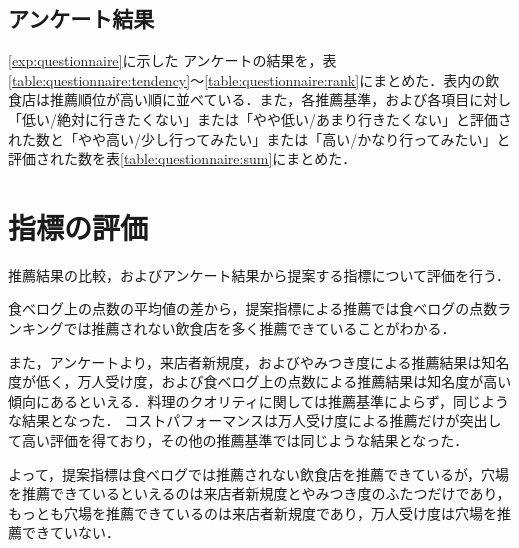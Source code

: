 	\subsection{アンケート結果}
	\ref{exp:questionnaire}に示した
	アンケートの結果を，表\ref{table:questionnaire:tendency}〜\ref{table:questionnaire:rank}にまとめた．表内の飲食店は推薦順位が高い順に並べている．また，各推薦基準，および各項目に対し「低い/絶対に行きたくない」または「やや低い/あまり行きたくない」と評価された数と「やや高い/少し行ってみたい」または「高い/かなり行ってみたい」と評価された数を表\ref{table:questionnaire:sum}にまとめた．
	
	
	
	
	
	
	
	\newpage

\section{指標の評価}
推薦結果の比較，およびアンケート結果から提案する指標について評価を行う．\par
食べログ上の点数の平均値の差から，提案指標による推薦では食べログの点数ランキングでは推薦されない飲食店を多く推薦できていることがわかる．
\par
また，アンケートより，来店者新規度，およびやみつき度による推薦結果は知名度が低く，万人受け度，および食べログ上の点数による推薦結果は知名度が高い傾向にあるといえる．料理のクオリティに関しては推薦基準によらず，同じような結果となった．
コストパフォーマンスは万人受け度による推薦だけが突出して高い評価を得ており，その他の推薦基準では同じような結果となった．%
\par
よって，提案指標は食べログでは推薦されない飲食店を推薦できているが，穴場を推薦できているといえるのは来店者新規度とやみつき度のふたつだけであり，もっとも穴場を推薦できているのは来店者新規度であり，万人受け度は穴場を推薦できていない．
